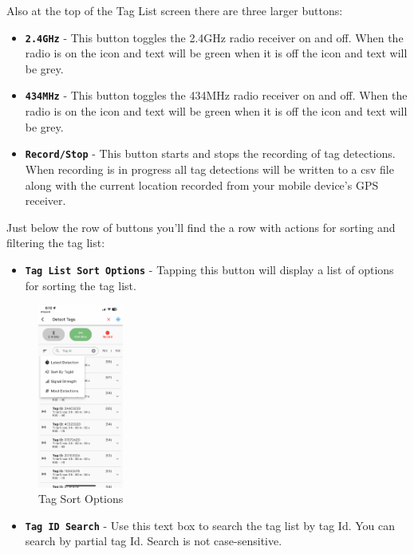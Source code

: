 \documentclass[
]{article}
\providecommand{\tightlist}{%
  \setlength{\itemsep}{0pt}\setlength{\parskip}{0pt}}
\begin{document}
Also at the top of the Tag List screen there are three larger buttons:

\begin{itemize}
\item
  \textbf{\texttt{2.4GHz}} - This button toggles the 2.4GHz radio
  receiver on and off. When the radio is on the icon and text will be
  green when it is off the icon and text will be grey.
\item
  \textbf{\texttt{434MHz}} - This button toggles the 434MHz radio
  receiver on and off. When the radio is on the icon and text will be
  green when it is off the icon and text will be grey.
\item
  \textbf{\texttt{Record/Stop}} - This button starts and stops the
  recording of tag detections. When recording is in progress all tag
  detections will be written to a csv file along with the current
  location recorded from your mobile device's GPS receiver.
\end{itemize}

Just below the row of buttons you'll find the a row with actions for
sorting and filtering the tag list:

\begin{itemize}
\tightlist
\item
  \textbf{\texttt{Tag\ List\ Sort\ Options}} - Tapping this button will
  display a list of options for sorting the tag list.
\end{itemize}

\begin{figure}
\hypertarget{id}{%
\centering
\includegraphics[width=0.25\textwidth,height=\textheight]{./images/ sidekick_sort.PNG}
\caption{Tag Sort Options}\label{id}
}
\end{figure}

\begin{itemize}
\tightlist
\item
  \textbf{\texttt{Tag\ ID\ Search}} - Use this text box to search the
  tag list by tag Id. You can search by partial tag Id. Search is not
  case-sensitive.
\end{itemize}
\end{document}
